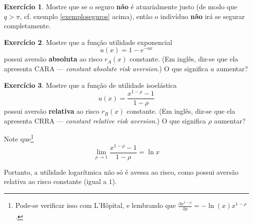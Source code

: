 \documentclass[12pt]{article}
\numberwithin{equation}{section}
\theoremstyle{plain}
\theoremstyle{definition}
\newtheorem{exercise}{Exercício}
\theoremstyle{remark}
\begin{document}



\begin{exercise}
  \parencite[exercício 6.C.1]{Mas-Colell1995} Mostre que se o seguro \textbf{não} é atuarialmente justo (de modo que \(q>\pi\), cf. exemplo \ref{exemploseguros} acima), então o indivíduo \textbf{não} irá se segurar completamente.
\end{exercise}

\begin{exercise}
  Mostre que a função utilidade exponencial
  \[
    u(x) = 1 - e^{-a x}
    \]
    possui aversão \textbf{absoluta} ao risco \(r_{A}(x)\) constante. (Em inglês, diz-se que ela apresenta CARA --- \textit{constant absolute risk aversion}.) O que significa \(a\) aumentar?
  \end{exercise}

\begin{exercise}
  Mostre que a função de utilidade isoelástica
  \[
  u(x) = \frac{x^{1-\rho} -1}{1-\rho}
  \]
  possui aversão \textbf{relativa} ao risco \(r_{R}(x)\) constante. (Em inglês, diz-se que ela apresenta CRRA --- \textit{constant relative risk aversion}.) O que significa \(\rho\) aumentar?

  Note que\footnote{Pode-se verificar isso com L'Hôpital, e lembrando que \(\frac{ \partial x^{1-\rho}}{ \partial \rho } = -\ln(x) x^{1-\rho}\).}
  \[
  \lim\limits_{\rho \to 1} \frac{x^{1-\rho} - 1}{1-\rho} = \ln x
  \]

  Portanto, a utilidade logarítmica não só é avessa ao risco, como possui aversão relativa ao risco constante (igual a \(1\)).
\end{exercise}
        
\end{document}
